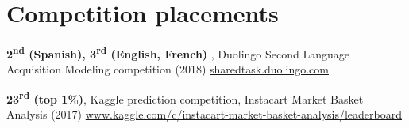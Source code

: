 \documentclass[10pt]{resume}
\begin{document}
\section{Competition placements}

\hrulefill

\begin{addmargin}[1em]{0em}

  \textbf{2\textsuperscript{nd} (Spanish), 3\textsuperscript{rd}
    (English, French)} , Duolingo Second Language Acquisition Modeling
  competition (2018) \newline
  \-\hspace{1em}\href{http://sharedtask.duolingo.com}{sharedtask.duolingo.com}

  \textbf{23\textsuperscript{rd} (top 1\%)}, Kaggle prediction
    competition, Instacart Market Basket Analysis (2017) \newline
    \-\hspace{1em} \href{https://www.kaggle.com/c/instacart-market-basket-analysis/leaderboard}{www.kaggle.com/c/instacart-market-basket-analysis/leaderboard}




\end{addmargin}





\end{document}
